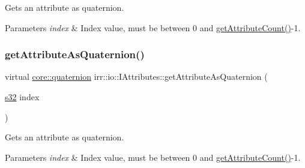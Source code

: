 Gets an attribute as quaternion. 


\begin{DoxyParams}{Parameters}
{\em index} & Index value, must be between 0 and \hyperlink{classirr_1_1io_1_1IAttributes_a796bdd9440ee7ba0b6742a90a82870b6}{get\+Attribute\+Count()}-\/1. \\
\hline
\end{DoxyParams}
\mbox{\label{classirr_1_1io_1_1IAttributes_aee7cc16cae259af9cbdd37bfc9956a5f}} 
\subsubsection{\texorpdfstring{get\+Attribute\+As\+Quaternion()}{getAttributeAsQuaternion()}\hspace{0.1cm}{\footnotesize\ttfamily [4/4]}}
{\footnotesize\ttfamily virtual \hyperlink{classirr_1_1core_1_1quaternion}{core\+::quaternion} irr\+::io\+::\+I\+Attributes\+::get\+Attribute\+As\+Quaternion (\begin{DoxyParamCaption}\item[{\hyperlink{namespaceirr_ac66849b7a6ed16e30ebede579f9b47c6}{s32}}]{index }\end{DoxyParamCaption})\hspace{0.3cm}{\ttfamily [pure virtual]}}



Gets an attribute as quaternion. 


\begin{DoxyParams}{Parameters}
{\em index} & Index value, must be between 0 and \hyperlink{classirr_1_1io_1_1IAttributes_a796bdd9440ee7ba0b6742a90a82870b6}{get\+Attribute\+Count()}-\/1. \\
\hline
\end{DoxyParams}
\mbox{\label{classirr_1_1io_1_1IAttributes_ac2d077105e2e7c263ea181f67a005cc2}} 
